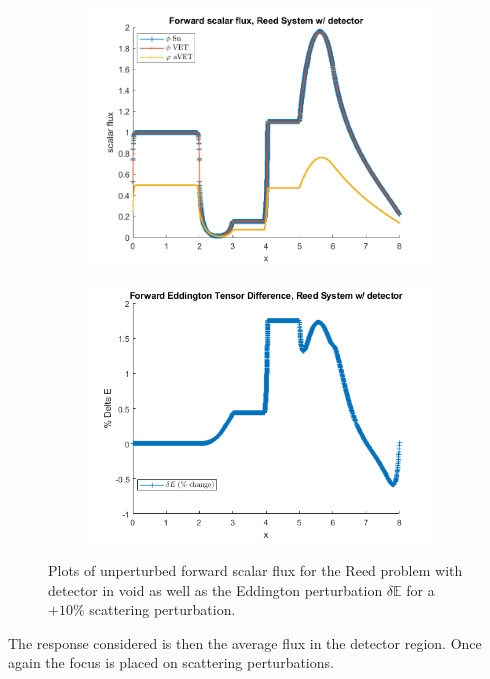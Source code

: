 \documentclass[12pt]{report}
\newcommand{\Edd}{\mathbb{E}}
\begin{document}
\begin{figure}[H]
\centering
\begin{subfigure}{.5\textwidth}
  \centering
  \includegraphics[width=.98\linewidth]{figures2/775phi.png}
\end{subfigure}%
\begin{subfigure}{.5\textwidth}
  \centering
  \includegraphics[width=.98\linewidth]{figures2/775deltaE.png}
\end{subfigure}
\caption{Plots of unperturbed forward scalar flux for the Reed problem with detector in void as well as the Eddington perturbation $\delta \Edd$ for a $+10 \%$ scattering perturbation.}
\label{fig:Flux5}
\end{figure}
The response considered is then the average flux in the detector region. Once again the focus is placed on scattering perturbations.
\end{document}
